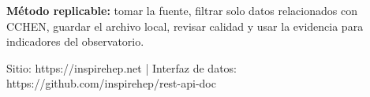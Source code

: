 \documentclass[9pt,a4paper]{extarticle}
\begin{document}
\vspace{0.06cm}
\begin{tcolorbox}[enhanced,colback=white,colframe=cchenpurple!55,boxrule=0.45pt,arc=2pt,left=6pt,right=6pt,top=5pt,bottom=5pt]
{\bfseries\color{cchenpurple}Método replicable:} tomar la fuente, filtrar solo datos relacionados con CCHEN, guardar el archivo local, revisar calidad y usar la evidencia para indicadores del observatorio.
\end{tcolorbox}

\vspace{0.02cm}
{\scriptsize\color{mutedgray}Sitio: https://inspirehep.net \quad | \quad Interfaz de datos: https://github.com/inspirehep/rest-api-doc}
\end{document}
